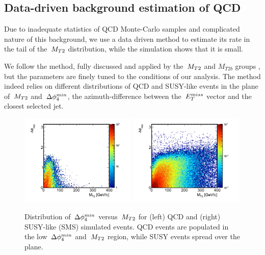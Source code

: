 \subsection[QCD Estimation]{Data-driven background estimation of QCD}\label{subsect:qcd}

Due to inadequate statistics of QCD Monte-Carlo samples and complicated nature of this background, 
we use a data driven method to estimate its rate in the tail of the $\,{M_{T2}}$ distribution, while the simulation shows that it is small.

We follow the method, fully discussed and applied by the $\,{M_{T2}}$ and $M_{T2b}$ groups \cite{MT2_2011},
 but the parameters are finely tuned to the conditions of our analysis.
The method indeed relies on different distributions of QCD and SUSY-like events 
in the plane of $\,{M_{T2}}$ and $\,{\Delta\phi_{4}^{min}}$, 
the azimuth-difference between the $\,{E_T^{miss}}$ vector and the closest selected jet.

\begin{linenomath}
\begin{figure}[h]
\centering
\includegraphics[width=0.49\textwidth,keepaspectratio=true]{QCDFig/qcd_distribution.png}
\includegraphics[width=0.49\textwidth,keepaspectratio=true]{QCDFig/sms_distribution.png}
\caption[DPhi vs. MT2 Distribution]{Distribution of $\,{\Delta\phi_{4}^{min}}$ versus $\,{M_{T2}}$ for (left) QCD and 
(right) SUSY-like (SMS) simulated events. QCD events are populated in the low $\,{\Delta\phi_{4}^{min}}$ and $\,{M_{T2}}$ region, while
SUSY events spread over the plane.}
\label{fig:distributions}
\end{figure}
\end{linenomath}

